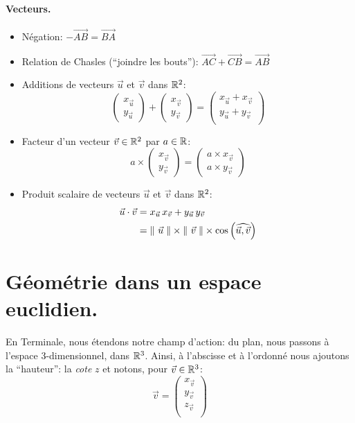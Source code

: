 \documentclass[12pt]{article}
\begin{document}
\paragraph{Vecteurs.}
\begin{itemize}
    \item Négation: $-\overrightarrow{AB} = \overrightarrow{BA}$
    \item Relation de Chasles (\enquote{joindre les bouts}): $
          \overrightarrow{AC} + \overrightarrow{CB}
        = \overrightarrow{AB}
    $
    \item Additions de vecteurs $\vec{u}$ et $\vec{v}$ dans $\mathbb{R}^2$: $$
      \begin{pmatrix} x_{\vec{u}} \\ y_{\vec{u}} \end{pmatrix}
    + \begin{pmatrix} x_{\vec{v}} \\ y_{\vec{v}} \end{pmatrix}
    = \begin{pmatrix} 
        x_{\vec{u}} + x_{\vec{v}} \\ 
        y_{\vec{u}} + y_{\vec{v}} \\ 
    \end{pmatrix} $$

    \item Facteur d'un vecteur $\vec{v} \in \mathbb{R}^2$ par $a \in \mathbb{R}$: $$
          a \times \begin{pmatrix} x_{\vec{v}} \\ y_{\vec{v}} \end{pmatrix}
        = \begin{pmatrix} a \times x_{\vec{v}} \\ a \times y_{\vec{v}} \end{pmatrix}
    $$
    \item Produit scalaire de vecteurs $\vec{u}$ et $\vec{v}$ dans $\mathbb{R}^2$: $$
    \begin{aligned}
        \vec{u} \cdot \vec{v} 
        & = x_{\vec{u}} \, x_{\vec{v}} + y_{\vec{u}} \, y_{\vec{v}} \\
        & = \left\lVert\ \vec{u}\;\right\rVert \times \left\lVert\ \vec{v}\;\right\rVert \times 
            \cos\left(\widehat{\vec{u}, \vec{v}}\right)
    \end{aligned}
    $$

\end{itemize}


\section{Géométrie dans un espace euclidien.}
En Terminale, nous étendons notre champ d'action: 
du plan, nous passons à l'espace 3-dimensionnel, dans $\mathbb{R}^3$.
Ainsi, à l'abscisse et à l'ordonné nous ajoutons la \enquote{hauteur}:
la \textit{cote} $z$ et notons, pour $\vec{v} \in \mathbb{R}^3$: $$
    \vec{v} = \begin{pmatrix}
        x_{\vec{v}} \\
        y_{\vec{v}} \\
        z_{\vec{v}} \\
    \end{pmatrix}
$$
\end{document}
